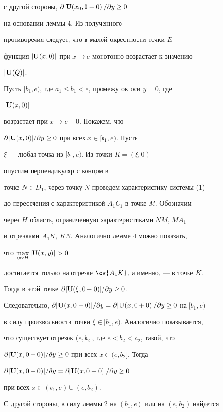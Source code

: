 с другой стороны, $\partial|\bold U(x_0,0-0)|/\partial y\ge0$


на основании леммы 4. Из полученного


противоречия следует, что в малой окрестности точки $E$


функция $|\bold U(x,0)|$ при $x\to e$ монотонно возрастает к значению


$|\bold U(Q)|$.





Пусть $[b_1,e)$, где $a_1\le b_1<e$, промежуток оси $y=0$, где


$|\bold U(x,0)|$


возрастает при $x\to e-0$. Покажем, что


$\partial|\bold U(x,0)|/\partial y\ge0$ при всех $x\in[b_1,e)$. Пусть


$\xi$ --- любая точка из $[b_1,e)$. Из точки $K=(\xi,0)$


опустим перпендикуляр с концом в 


точке $N\in D_1$, через точку $N$ проведем характеристику системы (1)


до пересечения с характеристикой $A_1C_1$ в точке $M$. Обозначим


через $H$ область, ограниченную характеристиками $NM$, $MA_1$


и отрезками $A_1K$, $KN$. Аналогично лемме 4 можно показать,


что $\max\limits_{\ov H}|\bold U(x,y)|>0$


достигается только на отрезке $\ov{A_1K}$, а именно, --- в точке $K$.


Тогда в этой точке $\partial|\bold U(\xi,0-0)|/\partial y\ge0$.


Следовательно, $\partial|\bold U(x,0-0)|/\partial y=


\partial|\bold U(x,0+0)|/\partial y\ge0$ на $[b_1,e)$


в силу произвольности точки $\xi\in[b_1,e)$. Аналогично показывается,


что существует отрезок $(e,b_2]$, где $e<b_2<a_2$, такой, что


$\partial|\bold U(x,0-0)|/\partial y\ge0$ при всех $x\in(e,b_2]$. Тогда


$\partial|\bold U(x,0-0)|/\partial y=\partial|\bold U(x,0+0)|/\partial y


\ge0$


при всех $x\in(b_1,e)\cup(e,b_2)$.


С другой стороны, в силу леммы 2 на $(b_1,e)$ или на $(e,b_2)$ найдется


